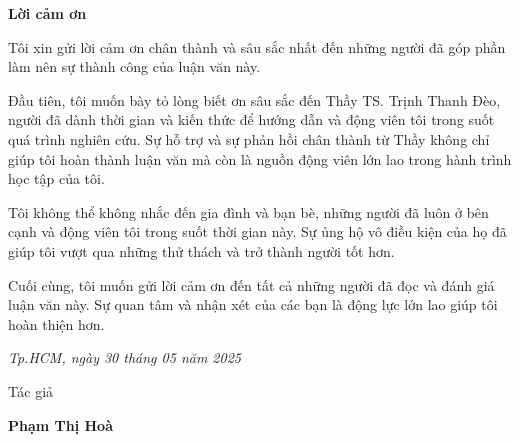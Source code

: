 \vspace*{3cm}

\begin{center}
\LARGE{\textbf{Lời cảm ơn}}
\end{center}

Tôi xin gửi lời cảm ơn chân thành và sâu sắc nhất đến những người đã góp phần làm nên sự thành công của luận văn này.

Đầu tiên, tôi muốn bày tỏ lòng biết ơn sâu sắc đến Thầy TS. Trịnh Thanh Đèo, người đã dành thời gian và kiến thức để hướng dẫn và động viên tôi trong suốt quá trình nghiên cứu. Sự hỗ trợ và sự phản hồi chân thành từ Thầy không chỉ giúp tôi hoàn thành luận văn mà còn là nguồn động viên lớn lao trong hành trình học tập của tôi.

Tôi không thể không nhắc đến gia đình và bạn bè, những người đã luôn ở bên cạnh và động viên tôi trong suốt thời gian này. Sự ủng hộ vô điều kiện của họ đã giúp tôi vượt qua những thử thách và trở thành người tốt hơn.

Cuối cùng, tôi muốn gửi lời cảm ơn đến tất cả những người đã đọc và đánh giá luận văn này. Sự quan tâm và nhận xét của các bạn là động lực lớn lao giúp tôi hoàn thiện hơn.
\begin{flushright}
{\it Tp.HCM, ngày 30 tháng 05 năm 2025}

Tác giả\hskip 2cm\quad

\vskip 2cm

{\bf Phạm Thị Hoà} \hskip 1cm \quad\ 
 \end{flushright}
\thispagestyle{empty}
